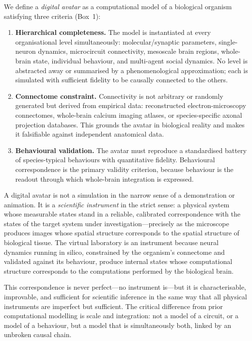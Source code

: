 \documentclass[12pt,a4paper]{article}
\begin{document}
We define a \emph{digital avatar} as a computational model of a
biological organism satisfying three criteria (Box~1):

\begin{enumerate}[leftmargin=1.8em, topsep=4pt, itemsep=3pt]

  \item \textbf{Hierarchical completeness.}
    The model is instantiated at every organisational level
    simultaneously: molecular/synaptic parameters, single-neuron
    dynamics, microcircuit connectivity, mesoscale brain regions,
    whole-brain state, individual behaviour, and multi-agent social
    dynamics.
    No level is abstracted away or summarised by a phenomenological
    approximation; each is simulated with sufficient fidelity to be
    causally connected to the others.

  \item \textbf{Connectome constraint.}
    Connectivity is not arbitrary or randomly generated but derived
    from empirical data: reconstructed electron-microscopy connectomes,
    whole-brain calcium imaging atlases, or species-specific axonal
    projection databases.
    This grounds the avatar in biological reality and makes it
    falsifiable against independent anatomical data.

  \item \textbf{Behavioural validation.}
    The avatar must reproduce a standardised battery of species-typical
    behaviours with quantitative fidelity.
    Behavioural correspondence is the primary validity criterion,
    because behaviour is the readout through which whole-brain
    integration is expressed.

\end{enumerate}

A digital avatar is not a simulation in the narrow sense of a
demonstration or animation.
It is a \emph{scientific instrument} in the strict sense: a physical
system whose measurable states stand in a reliable, calibrated
correspondence with the states of the target system under
investigation---precisely as the microscope produces images whose
spatial structure corresponds to the spatial structure of biological
tissue.
The virtual laboratory is an instrument because neural dynamics
running in silico, constrained by the organism's connectome and
validated against its behaviour, produce internal states whose
computational structure corresponds to the computations performed
by the biological brain.

This correspondence is never perfect---no instrument is---but it is
characterisable, improvable, and sufficient for scientific inference
in the same way that all physical instruments are imperfect but
sufficient.
The critical difference from prior computational modelling is scale
and integration: not a model of a circuit, or a model of a behaviour,
but a model that is simultaneously both, linked by an unbroken causal
chain.
\end{document}
